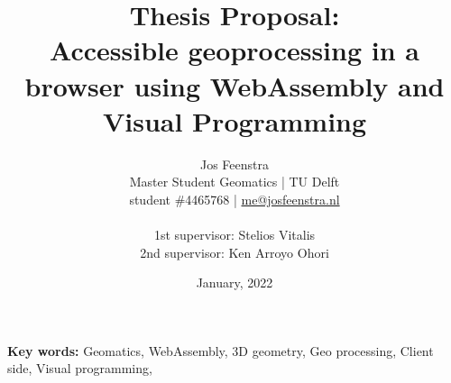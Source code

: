 \documentclass[a4paper,10pt]{scrartcl}
\title{Thesis Proposal: \\
Accessible geoprocessing in a browser using WebAssembly and Visual Programming
}
\author{
  Jos Feenstra\\
  Master Student Geomatics | TU Delft\\
  student \#4465768 | \url{me@josfeenstra.nl}\\
  \\
  1st supervisor: Stelios Vitalis \\
  2nd supervisor: Ken Arroyo Ohori \\
}
\date{January, 2022}
\begin{document}
  
\clearpage\maketitle
\thispagestyle{empty}
\sffamily

\begin{center}
  \textbf{Key words:} Geomatics, WebAssembly, 3D geometry, Geo processing, Client side, Visual programming, 
\end{center}

\newpage
\printacronyms

\newpage
\tableofcontents

\newpage

\newpage

\newpage

\newpage

\newpage

\newpage


\newpage




\end{document}

